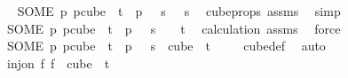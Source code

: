 \begin{isabellebody}
\ \isamarkupfalse%
\ {\isachardoublequoteopen}{\isacharparenleft}{\kern0pt}SOME\ p{\isachardot}{\kern0pt}\ p{\isasymin}cube\ {}\ {\isacharparenleft}{\kern0pt}t{\isacharplus}{\kern0pt}{}{\isacharparenright}{\kern0pt}\ {\isasymand}\ p\ {}\ {\isacharequal}{\kern0pt}\ s{\isacharparenright}{\kern0pt}\ {}\ {\isacharequal}{\kern0pt}\ s{\isachardoublequoteclose}\ \isamarkupfalse%
\ cube{\isacharunderscore}{\kern0pt}props\ assms\ \isamarkupfalse%
\ simp\isanewline
\ \ \isamarkupfalse%
\isanewline
\ \ \isacommand{{\isacharbraceleft}{\kern0pt}}\isamarkupfalse%
\isanewline
\ \ \ \ \isamarkupfalse%
\ {\isachardoublequoteopen}{\isacharparenleft}{\kern0pt}SOME\ p{\isachardot}{\kern0pt}\ p{\isasymin}cube\ {}\ {\isacharparenleft}{\kern0pt}t{\isacharplus}{\kern0pt}{}{\isacharparenright}{\kern0pt}\ {\isasymand}\ p\ {}\ {\isacharequal}{\kern0pt}\ s{\isacharparenright}{\kern0pt}\ {\isacharbackquote}{\kern0pt}\ {\isacharbraceleft}{\kern0pt}{\isachardot}{\kern0pt}{\isachardot}{\kern0pt}{\isacharless}{\kern0pt}{}{\isacharbraceright}{\kern0pt}\ {\isasymsubseteq}\ {\isacharbraceleft}{\kern0pt}{\isachardot}{\kern0pt}{\isachardot}{\kern0pt}{\isacharless}{\kern0pt}t{\isacharbraceright}{\kern0pt}{\isachardoublequoteclose}\ \isamarkupfalse%
\ calculation\ assms\ \isamarkupfalse%
\ force\isanewline
\ \ \ \ \isamarkupfalse%
\ \isamarkupfalse%
\ {\isachardoublequoteopen}{\isacharparenleft}{\kern0pt}SOME\ p{\isachardot}{\kern0pt}\ p{\isasymin}cube\ {}\ {\isacharparenleft}{\kern0pt}t{\isacharplus}{\kern0pt}{}{\isacharparenright}{\kern0pt}\ {\isasymand}\ p\ {}\ {\isacharequal}{\kern0pt}\ s{\isacharparenright}{\kern0pt}\ {\isasymin}\ cube\ {}\ t{\isachardoublequoteclose}\ \isamarkupfalse%
\ {\isacharasterisk}{\kern0pt}\ \isamarkupfalse%
\ cube{\isacharunderscore}{\kern0pt}def\ \isamarkupfalse%
\ auto\ \ \isanewline
\ \ \isacommand{{\isacharbraceright}{\kern0pt}}\isamarkupfalse%
\isanewline
\ \ \isamarkupfalse%
\ \isamarkupfalse%
\ {\isachardoublequoteopen}inj{\isacharunderscore}{\kern0pt}on\ {\isacharparenleft}{\kern0pt}{\isasymlambda}f{\isachardot}{\kern0pt}\ f\ {}{\isacharparenright}{\kern0pt}\ {\isacharparenleft}{\kern0pt}cube\ {}\ t{\isacharparenright}{\kern0pt}{\isachardoublequoteclose}\ \isamarkupfalse%

\end{isabellebody}
